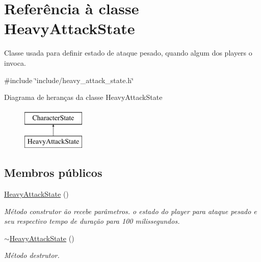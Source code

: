 \hypertarget{classHeavyAttackState}{}\section{Referência à classe Heavy\+Attack\+State}
\label{classHeavyAttackState}


Classe usada para definir estado de ataque pesado, quando algum dos players o invoca.  




{\ttfamily \#include \char`\"{}include/heavy\+\_\+attack\+\_\+state.\+h\char`\"{}}

Diagrama de heranças da classe Heavy\+Attack\+State\begin{figure}[H]
\begin{center}
\leavevmode
\includegraphics[height=2.000000cm]{classHeavyAttackState}
\end{center}
\end{figure}
\subsection*{Membros públicos}
\begin{DoxyCompactItemize}
\item 
\mbox{\label{classHeavyAttackState_a8e27901035d039a1cadf91842bc76d88}} 
\mbox{\hyperlink{classHeavyAttackState_a8e27901035d039a1cadf91842bc76d88}{Heavy\+Attack\+State}} ()
\begin{DoxyCompactList}\small\item\em Método construtor ão recebe parâmetros.  o estado do player para ataque pesado e seu respectivo tempo de duração para 100 milissegundos. \end{DoxyCompactList}\item 
\mbox{\label{classHeavyAttackState_aa19aad84df0bf94a9db9d28068c39f0b}} 
\mbox{\hyperlink{classHeavyAttackState_aa19aad84df0bf94a9db9d28068c39f0b}{$\sim$\+Heavy\+Attack\+State}} ()
\begin{DoxyCompactList}\small\item\em Método destrutor. \end{DoxyCompactList}\end{DoxyCompactItemize}
